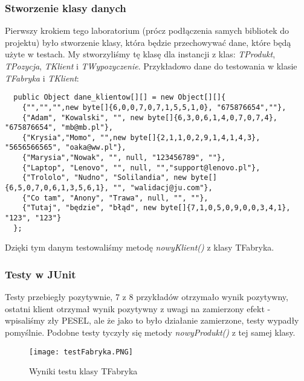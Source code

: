 \documentclass{article}
\begin{document}
\subsubsection{Stworzenie klasy danych}
Pierwszy krokiem tego laboratorium (prócz podłączenia samych bibliotek do projektu) było stworzenie klasy, która będzie przechowywać dane, które będą użyte w testach. My stworzyliśmy tę klasę dla instancji z klas: \textit{TProdukt}, \textit{TPozycja}, \textit{TKlient} i \textit{TWypozyczenie}. Przykładowo dane do testowania w klasie \textit{TFabryka} i \textit{TKlient}:
\begin{verbatim}
  public Object dane_klientow[][] = new Object[][]{
    {"","","",new byte[]{6,0,0,7,0,7,1,5,5,1,0}, "675876654",""},
    {"Adam", "Kowalski", "", new byte[]{6,3,0,6,1,4,0,7,0,7,4}, "675876654", "mb@mb.pl"},
    {"Krysia","Momo", "",new byte[]{2,1,1,0,2,9,1,4,1,4,3}, "5656566565", "oaka@ww.pl"},
    {"Marysia","Nowak", "", null, "123456789", ""},
    {"Laptop", "Lenovo", "", null, "","support@lenovo.pl"},
    {"Trololo", "Nudno", "Solilandia", new byte[]{6,5,0,7,0,6,1,3,5,6,1}, "", "walidacj@ju.com"},
    {"Co tam", "Anony", "Trawa", null, "", ""},
    {"Tutaj", "będzie", "błąd", new byte[]{7,1,0,5,0,9,0,0,3,4,1}, "123", "123"}  
  };
\end{verbatim}
Dzięki tym danym testowaliśmy metodę \textit{nowyKlient()} z klasy TFabryka. 
\subsubsection{Testy w JUnit}
Testy przebiegły pozytywnie, 7 z 8 przykładów otrzymało wynik pozytywny, ostatni klient otrzymał wynik pozytywny z uwagi na zamierzony efekt - wpisaliśmy zły PESEL, ale że jako to było działanie zamierzone, testy wypadły pomyślnie. Podobne testy tyczyły się metody \textit{nowyProdukt()} z tej samej klasy.
\newpage
\begin{figure}[!ht]
\centering
\texttt{[image: testFabryka.PNG]}
\caption{Wyniki testu klasy TFabryka}
\end{figure}
\end{document}
